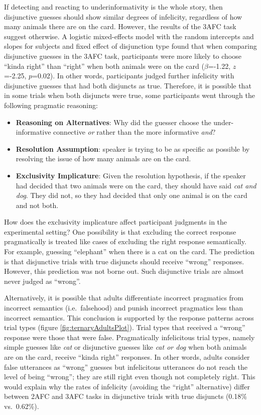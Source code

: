 \documentclass[floatsintext,man]{apa6}
\theoremstyle{definition}
\theoremstyle{definition}
\theoremstyle{definition}
\theoremstyle{remark}
\begin{document}
If detecting and reacting to underinformativity is the whole story, then
disjunctive guesses should show similar degrees of infelicity,
regardless of how many animals there are on the card. However, the
results of the 3AFC task suggest otherwise. A logistic mixed-effects
model with the random intercepts and slopes for subjects and fixed
effect of disjunction type found that when comparing disjunctive guesses
in the 3AFC task, participants were more likely to choose \enquote{kinda
right} than \enquote{right} when both animals were on the card
(\(\beta\)=-1.22, \(z\)=-2.25, \(p\)=0.02). In other words, participants
judged further infelicity with disjunctive guesses that had both
disjuncts as true. Therefore, it is possible that in some trials when
both disjuncts were true, some participants went through the following
pragmatic reasoning:

\begin{itemize}
\item
  \textbf{Reasoning on Alternatives}: Why did the guesser choose the
  under-informative connective \emph{or} rather than the more
  informative \emph{and}?
\item
  \textbf{Resolution Assumption}: speaker is trying to be as specific as
  possible by resolving the issue of how many animals are on the card.
\item
  \textbf{Exclusivity Implicature}: Given the resolution hypothesis, if
  the speaker had decided that two animals were on the card, they should
  have said \emph{cat and dog}. They did not, so they had decided that
  only one animal is on the card and not both.
\end{itemize}

How does the exclusivity implicature affect participant judgments in the
experimental setting? One possibility is that excluding the correct
response pragmatically is treated like cases of excluding the right
response semantically. For example, guessing \enquote{elephant} when
there is a cat on the card. The prediction is that disjunctive trials
with true disjuncts should receive \enquote{wrong} responses. However,
this prediction was not borne out. Such disjunctive trials are almost
never judged as \enquote{wrong}.

Alternatively, it is possible that adults differentiate incorrect
pragmatics from incorrect semantics (i.e.~falsehood) and punish
incorrect pragmatics less than incorrect semantics. This conclusion is
supported by the response patterns across trial types (figure
\ref{fig:ternaryAdultsPlot}). Trial types that received a
\enquote{wrong} response were those that were false. Pragmatically
infelicitous trial types, namely simple guesses like \emph{cat} or
disjunctive guesses like \emph{cat or dog} when both animals are on the
card, receive \enquote{kinda right} responses. In other words, adults
consider false utterances as \enquote{wrong} guesses but infelicitous
utterances do not reach the level of being \enquote{wrong}; they are
still right even though not completely right. This would explain why the
rates of infelicity (avoiding the \enquote{right} alternative) differ
between 2AFC and 3AFC tasks in disjunctive trials with true disjuncts
(0.18\% vs.~0.62\%).
\end{document}
